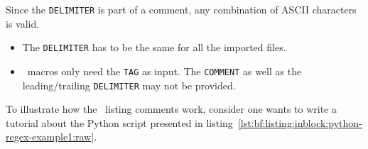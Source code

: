 		\newpage
	
		Since the \lstinline$DELIMITER$ is part of a comment, any combination of ASCII characters is valid.
		\begin{daWarningBox}
			\begin{itemize}[leftmargin=*]
				\setlength\itemsep{-0.1em}
				\item The \lstinline$DELIMITER$ has to be the same for all the imported files.
				\item \productName~macros only need the 
				\lstinline$TAG$ as input. The \lstinline$COMMENT$ as well as the
				leading/trailing \lstinline$DELIMITER$ may not be provided. 
			\end{itemize}
		\end{daWarningBox}
		To illustrate how the \productName~listing comments work, consider one wants to write a tutorial about the Python script presented in \mbox{listing \ref{lst:bf:listing:inblock:python-regex-example1:raw}}.
		\lstset{style=Python}
		

